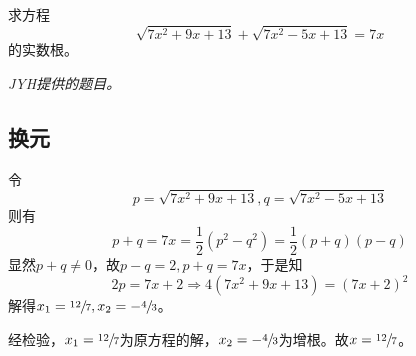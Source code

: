 

求方程
\[ \sqrt{7x^2 + 9x + 13} + \sqrt{7x^2 - 5x + 13} = 7x \]
的实数根。

\textit{JYH提供的题目。}


\subsection{换元}

令
\[ p = \sqrt{7x^2 + 9x + 13}, q = \sqrt{7x^2 - 5x + 13} \]
则有
\[ p + q = 7x = \frac12\left(p^2 - q^2\right) = \frac12(p + q)(p - q) \]
显然$p + q \ne 0$，故$p - q = 2, p + q = 7x$，于是知
\[ 2p = 7x + 2 \Rightarrow 4\left(7x^2 + 9x + 13\right) = (7x + 2)^2 \]
解得$x_1 = \sfrac{12}7, x_2 = -\sfrac43$。

经检验，$x_1 = \sfrac{12}7$为原方程的解，$x_2 = -\sfrac43$为增根。故$x = \sfrac{12}7$。
